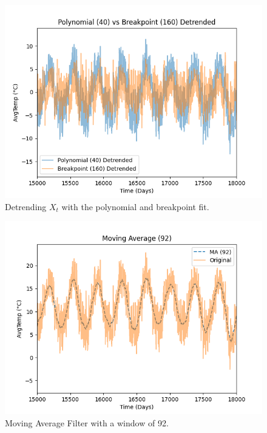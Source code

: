\documentclass[conference]{IEEEtran}
\begin{document}
\begin{figure}[ht]
    \centering
    \includegraphics[scale=0.4]{Figures/GlasnevinLin/Polynomial (40) vs Breakpoint (160) Detrended.png}
    \caption{Detrending $X_t$ with the polynomial and breakpoint fit.}
    \label{airbrpolg}
\end{figure}
\vspace{80mm}

\begin{figure}[ht]
    \centering
    \includegraphics[scale=0.4]{Figures/GlasnevinLin/Moving Average (92).png}
    \caption{Moving Average Filter with a window of 92.}
    \label{airmag}
\end{figure}
\end{document}
